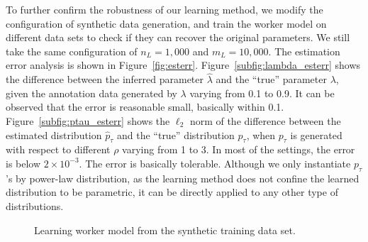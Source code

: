 To further confirm the robustness of our learning method, 
we modify the configuration of synthetic data generation, 
and train the worker model on different data sets to check if they can recover the original parameters.  
We still take the same configuration of $n_L = 1,000$ and $m_L = 10,000$.  
The estimation error analysis is shown in Figure~\ref{fig:esterr}.  
Figure~\ref{subfig:lambda_esterr} shows the difference between the inferred parameter $\hat{\lambda}$ 
and the ``true'' parameter $\lambda$, 
given the annotation data generated by $\lambda$ varying from 0.1 to 0.9.  
It can be observed that the error is reasonable small, basically within 0.1.  
Figure~\ref{subfig:ptau_esterr} shows the $\ell_2$ norm of the difference between the estimated distribution $\hat{p}_{\tau}$
and the ``true'' distribution $p_{\tau}$, 
when $p_{\tau}$ is generated with respect to different $\rho$ varying from 1 to 3.  
In most of the settings, the error is below $2 \times 10^{-3}$.  
The error is basically tolerable.  
Although we only instantiate $p_{\tau}$'s by power-law distribution, 
as the learning method does not confine the learned distribution to be parametric, 
it can be directly applied to any other type of distributions.  



\begin{figure}[!t]
  \centering
  \caption{\label{fig:synthetic_training}
  Learning worker model from the synthetic training data set.
  }
\end{figure}

